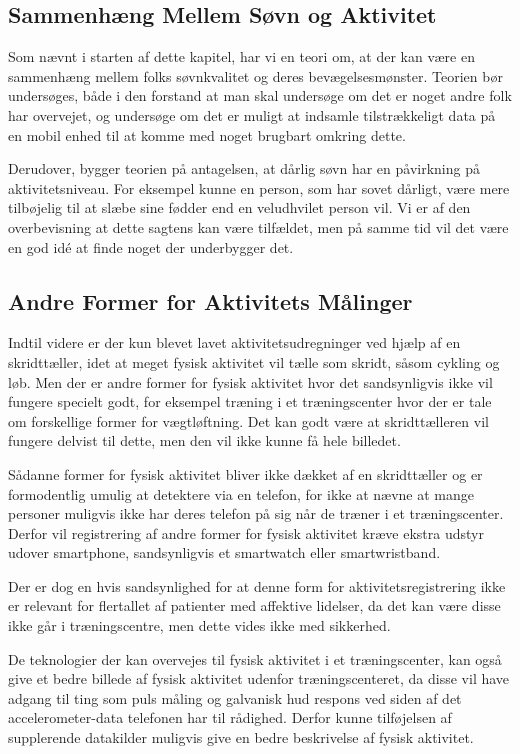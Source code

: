 \subsection{Sammenhæng Mellem Søvn og Aktivitet}
Som nævnt i starten af dette kapitel, har vi en teori om, at der kan være en sammenhæng mellem folks søvnkvalitet og deres bevægelsesmønster.
Teorien bør undersøges, både i den forstand at man skal undersøge om det er noget andre folk har overvejet, og undersøge om det er muligt at indsamle tilstrækkeligt data på en mobil enhed til at komme med noget brugbart omkring dette.

Derudover, bygger teorien på antagelsen, at dårlig søvn har en påvirkning på aktivitetsniveau.
For eksempel kunne en person, som har sovet dårligt, være mere tilbøjelig til at slæbe sine fødder end en veludhvilet person vil.
Vi er af den overbevisning at dette sagtens kan være tilfældet, men på samme tid vil det være en god idé at finde noget der underbygger det.

\subsection{Andre Former for Aktivitets Målinger}
Indtil videre er der kun blevet lavet aktivitetsudregninger ved hjælp af en skridttæller, idet at meget fysisk aktivitet vil tælle som skridt, såsom cykling og løb. 
Men der er andre former for fysisk aktivitet hvor det sandsynligvis ikke vil fungere specielt godt, for eksempel træning i et træningscenter hvor der er tale om forskellige former for vægtløftning. 
Det kan godt være at skridttælleren vil fungere delvist til dette, men den vil ikke kunne få hele billedet.

Sådanne former for fysisk aktivitet bliver ikke dækket af en skridttæller og er formodentlig umulig at detektere via en telefon, for ikke at nævne at mange personer muligvis ikke har deres telefon på sig når de træner i et træningscenter.
Derfor vil registrering af andre former for fysisk aktivitet kræve ekstra udstyr udover smartphone, sandsynligvis et smartwatch eller smartwristband.

Der er dog en hvis sandsynlighed for at denne form for aktivitetsregistrering ikke er relevant for flertallet af patienter med affektive lidelser, da det kan være disse ikke går i træningscentre, men dette vides ikke med sikkerhed.

De teknologier der kan overvejes til fysisk aktivitet i et træningscenter, kan også give et bedre billede af fysisk aktivitet udenfor træningscenteret, da disse vil have adgang til ting som puls måling og galvanisk hud respons ved siden af det accelerometer-data telefonen har til rådighed.
Derfor kunne tilføjelsen af supplerende datakilder muligvis give en bedre beskrivelse af fysisk aktivitet.